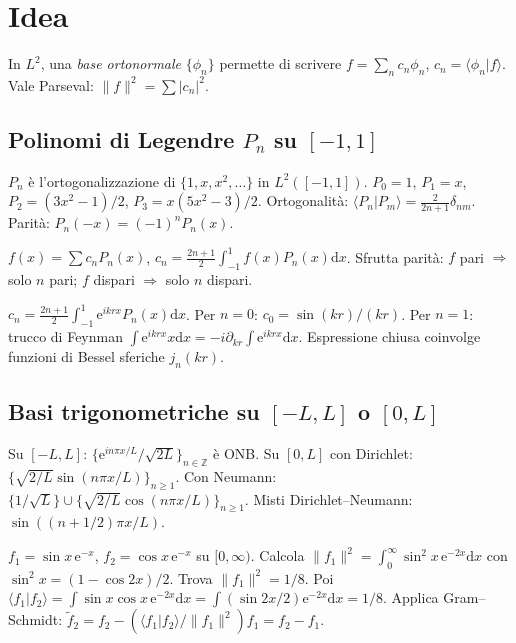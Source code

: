 \documentclass[11pt,a4paper,openany]{book}
\theoremstyle{definition}
\newcommand{\Z}{\mathbb{Z}}
\newcommand{\braket}[2]{\langle#1|#2\rangle}
\newcommand{\dd}{\mathrm{d}}
\newcommand{\eu}{\mathrm{e}}
\begin{document}
\section{Idea}
In $L^2$, una \emph{base ortonormale} $\{\phi_n\}$ permette di scrivere $f=\sum_n c_n\phi_n$, $c_n=\braket{\phi_n}{f}$. Vale Parseval: $\|f\|^2=\sum|c_n|^2$.

\subsection{Polinomi di Legendre $P_n$ su $[-1,1]$}
\begin{teoria}
$P_n$ \`e l'ortogonalizzazione di $\{1,x,x^2,\dots\}$ in $L^2([-1,1])$. $P_0=1$, $P_1=x$, $P_2=(3x^2-1)/2$, $P_3=x(5x^2-3)/2$. Ortogonalit\`a: $\braket{P_n}{P_m}=\frac{2}{2n+1}\delta_{nm}$. Parit\`a: $P_n(-x)=(-1)^n P_n(x)$.
\end{teoria}

\begin{algoritmo}
$f(x)=\sum c_n P_n(x)$, $c_n=\frac{2n+1}{2}\int_{-1}^1 f(x)P_n(x)\dd x$.
Sfrutta parit\`a: $f$ pari $\Rightarrow$ solo $n$ pari; $f$ dispari $\Rightarrow$ solo $n$ dispari.
\end{algoritmo}

\begin{esempio}[Set 2, Es. 3 -- $f(x)=\eu^{ikrx}$]
$c_n=\frac{2n+1}{2}\int_{-1}^1\eu^{ikrx}P_n(x)\dd x$. Per $n=0$: $c_0=\sin(kr)/(kr)$. Per $n=1$: trucco di Feynman $\int\eu^{ikrx}x\dd x=-i\partial_{kr}\int\eu^{ikrx}\dd x$. Espressione chiusa coinvolge funzioni di Bessel sferiche $j_n(kr)$.
\end{esempio}

\subsection{Basi trigonometriche su $[-L,L]$ o $[0,L]$}
\begin{formulario}
Su $[-L,L]$: $\{\eu^{i n\pi x/L}/\sqrt{2L}\}_{n\in\Z}$ \`e ONB. Su $[0,L]$ con Dirichlet: $\{\sqrt{2/L}\sin(n\pi x/L)\}_{n\ge 1}$. Con Neumann: $\{1/\sqrt L\}\cup\{\sqrt{2/L}\cos(n\pi x/L)\}_{n\ge 1}$. Misti Dirichlet--Neumann: $\sin((n+1/2)\pi x/L)$.
\end{formulario}

\begin{esempio}
$f_1=\sin x\,\eu^{-x}$, $f_2=\cos x\,\eu^{-x}$ su $[0,\infty)$. Calcola $\|f_1\|^2=\int_0^\infty\sin^2 x\,\eu^{-2x}\dd x$ con $\sin^2 x=(1-\cos 2x)/2$. Trova $\|f_1\|^2=1/8$. Poi $\braket{f_1}{f_2}=\int\sin x\cos x\,\eu^{-2x}\dd x=\int(\sin 2x/2)\eu^{-2x}\dd x=1/8$. Applica Gram--Schmidt: $\tilde f_2=f_2-(\braket{f_1}{f_2}/\|f_1\|^2)f_1=f_2-f_1$.
\end{esempio}
\end{document}

